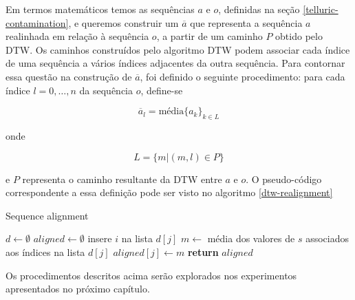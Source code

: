 Em termos matemáticos temos as sequências $a$ e $o$, definidas na seção \ref{telluric-contamination}, e queremos construir um $\overline{a}$ que representa a sequência $a$ realinhada em relação à sequência $o$, a partir de um caminho $P$ obtido pelo DTW. Os caminhos construídos pelo algoritmo DTW podem associar cada índice de uma sequência a vários índices adjacentes da outra sequência. Para contornar essa questão na construção de $\overline{a}$, foi definido o seguinte procedimento: para cada índice $l=0,\ldots,n$ da sequência $o$, define-se

\begin{equation*}
    \overline{a}_l = \mbox{média} \{a_k\}_{k \in L}
\end{equation*}

\noindent onde

\begin{equation*}
  L = \{m | (m, l) \in P\}
\end{equation*}

\noindent e $P$ representa o caminho resultante da DTW entre $a$ e $o$. O pseudo-código correspondente a essa definição pode ser visto no algoritmo \ref{dtw-realignment}

\begin{algorithm}[H]
\caption{Sequence alignment}\label{dtw-realignment}
\begin{algorithmic}[1]
    \State $d \gets \emptyset$ 
    \State $aligned \gets \emptyset$
        \State insere $i$ na lista $d[j]$
    \EndFor
        \State $m \gets$ média dos valores de $s$ associados aos índices na lista $d[j]$
        \State $aligned[j] \gets m$
    \EndFor
\State \textbf{return} $aligned$
\EndProcedure
\end{algorithmic}
\end{algorithm}

Os procedimentos descritos acima serão explorados nos experimentos apresentados no próximo capítulo.